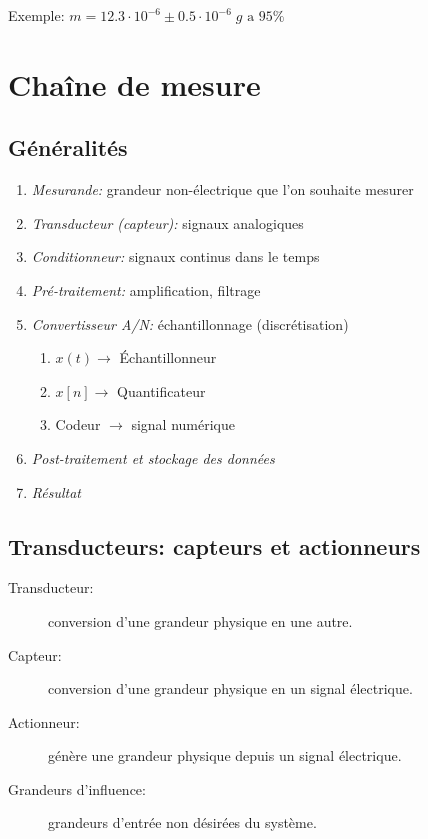 \documentclass[10pt, twocolumn]{article}
\begin{document}
			Exemple: $m=12.3\cdot 10^{-6} \pm 0.5\cdot 10^{-6} \; g \text{ a } 95\%$
			
	\section*{Chaîne de mesure}
	
		\subsection*{Généralités}
	
			\begin{enumerate}
				\item \emph{Mesurande:} grandeur non-électrique que l'on souhaite mesurer
				\item \emph{Transducteur (capteur):} signaux analogiques
				\item \emph{Conditionneur:} signaux continus dans le temps
				\item \emph{Pré-traitement:} amplification, filtrage
				\item \emph{Convertisseur A/N:} échantillonnage (discrétisation)
					\begin{enumerate}
						\item $x(t) \rightarrow$ Échantillonneur
						\item $x[n] \rightarrow$ Quantificateur
						\item Codeur $\rightarrow$ signal numérique
					\end{enumerate}
				\item \emph{Post-traitement et stockage des données}
				\item \emph{Résultat}
			\end{enumerate}
		
		\subsection*{Transducteurs: capteurs et actionneurs}
			
			\begin{description}
				\item [Transducteur:] conversion d'une grandeur physique en une autre.
				\item [Capteur:] conversion d'une grandeur physique en un signal électrique.
				\item [Actionneur:] génère une grandeur physique depuis un signal électrique.
				\item [Grandeurs d'influence:] grandeurs d'entrée non désirées du système.
			\end{description}
			
\end{document}
